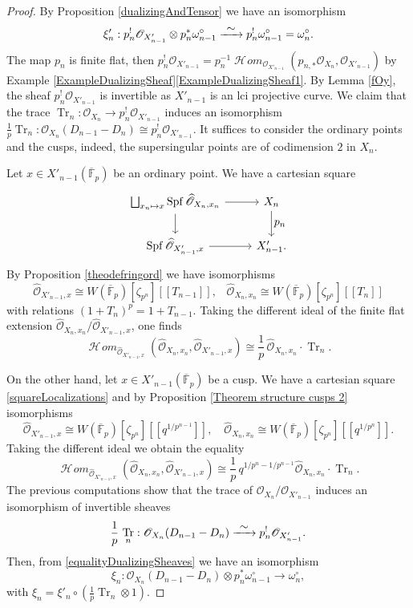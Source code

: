 \documentclass[JEP,XML,SOM,Unicode,published]{cedram}
\newcommand\mto{\mathchoice{\longmapsto}{\mapsto}{\mapsto}{\mapsto}}
\newcommand\To[1]{\mathchoice{\xrightarrow{\textstyle\kern4pt#1\kern3pt}}{\stackrel{#1}{\to}}{}{}}
\let\ts\textstyle
\newcommand{\lcr}{[\![}
\newcommand{\rcr}{]\!]}
\numberwithin{equation}{section}
\theoremstyle{definition}
\newcommand{\bb}[1]{\mathbb{#1}}
\newcommand{\s}[1]{\mathscr{#1}}
\DeclareMathOperator{\Tr}{Tr}
\DeclareMathOperator{\Spf}{Spf}
\DeclareMathOperator{\sHom}{\s{H}\!\mathit{om}}
\begin{document}
\begin{proof}
By Proposition \ref{dualizingAndTensor} we have an isomorphism
\begin{equation}
\label{equalityDualizingSheaves}
\xi'_n: p^!_n\s{O}_{X'_{n-1}}\otimes p_n^* \omega^\circ_{n-1}\To{\sim} p_n^! \omega_{n-1}^\circ=\omega_{n}^\circ.
\end{equation}
The map $p_n$ is finite flat, then $p_n^!\s{O}_{X'_{n-1}}= p_n^{-1}\sHom_{\s{O}_{X'_{n-1}}}(p_{n,*} \s{O}_{X_n}, \s{O}_{X'_{n-1}})$ by Example \ref{ExampleDualizingSheaf}\eqref{ExampleDualizingSheaf1}. By Lemma \ref{fOy}, the sheaf $p_n^! \s{O}_{X'_{n-1}}$ is invertible as $X'_{n-1}$ is an lci projective curve. We claim that the trace $\Tr_n:\s{O}_{X_n}\to p_n^! \s{O}_{X'_{n-1}}$ induces an isomorphism $\frac{1}{p} \Tr_n: \s{O}_{X_n}(D_{n-1}-D_n)\cong p^!_n \s{O}_{X'_{n-1}}$. It suffices to consider the ordinary points and the cusps, indeed, the supersingular points are of codimension $2$ in $X_n$.

Let $x\in X'_{n-1}(\overline{\bb{F}}_p)$ be an ordinary point. We have a cartesian square
\begin{equation}
\label{squareLocalizations}
\begin{tikzcd}
\bigsqcup_{x_n\mto x} \Spf \widehat{\s{O}}_{X_n, x_n} \ar[r] \ar[d]& X_n\ar[d,"\ts p_n"] \\
\Spf \widehat{\s{O}}_{X'_{n-1},x} \ar[r]& X'_{n-1}.
\end{tikzcd}
\end{equation}
By Proposition \ref{theodefringord} we have isomorphisms
\[
\widehat{\s{O}}_{X'_{n-1},x}\cong W(\overline{\bb{F}}_p)[\zeta_{p^{n}}]\lcr T_{n-1}\rcr, \;\;\; \widehat{\s{O}}_{X_n,x_n}\cong W(\overline{\bb{F}}_p)[\zeta_{p^{n}}]\lcr T_{n}\rcr
\]
with relations $(1+T_n)^p=1+T_{n-1}$. Taking the different ideal of the finite flat extension $\widehat{\s{O}}_{X_n,x_n} / \widehat{\s{O}}_{X'_{n-1},x}$, one finds
\[
\sHom_{\widehat{\s{O}}_{X'_{n-1},x}}(\widehat{\s{O}}_{X_n,x_n},\widehat{\s{O}}_{X'_{n-1},x})\cong \frac{1}{p}\,\widehat{\s{O}}_{X_n,x_n}\cdot \Tr_{n} .
\]

On the other hand, let $x\in X'_{n-1}(\overline{\bb{F}}_p)$ be a cusp. We have a cartesian square \eqref{squareLocalizations} and by Proposition \ref{Theorem structure cusps 2} isomorphisms
\[
\widehat{\s{O}}_{X'_{n-1},x}\cong W(\overline{\bb{F}}_p)[\zeta_{p^{n}}]\lcr q^{1/p^{n-1}}\rcr, \quad \widehat{\s{O}}_{X_n,x_n}\cong W(\overline{\bb{F}}_p)[\zeta_{p^{n}}]\lcr q^{1/p^{n}}\rcr.
\]
Taking the different ideal we obtain the equality
\[
\sHom_{\widehat{\s{O}}_{X'_{n-1},x}}(\widehat{\s{O}}_{X_n,x_n},\widehat{\s{O}}_{X'_{n-1},x}) \cong \frac{1}{p}\, q^{1/p^n-1/p^{n-1}} \widehat{\s{O}}_{X_n,x_n}\cdot \Tr_n.
\]
The previous computations show that the trace of $\s{O}_{X_n}/\s{O}_{X'_{n-1}}$ induces an isomorphism of invertible sheaves
\[
\frac{1}{p}\, \Tr_n: \s{O}_{X_n}(D_{n-1}- D_n) \To{\sim} p_n^!\s{O}_{X'_{n-1}}.
\]
Then, from \eqref{equalityDualizingSheaves} we have an isomorphism
\[
\xi_{n}: \s{O}_{X_n}(D_{n-1}- D_n)\otimes p_n^*\omega^\circ_{n-1}\to \omega^\circ_n,
\]
with $\xi_n= \xi'_n\circ (\frac{1}{p} \Tr_n \otimes 1)$.


\end{proof}
\end{document}
